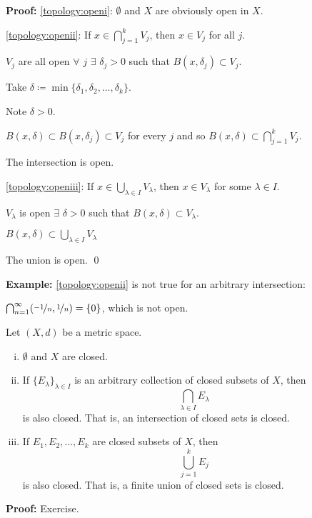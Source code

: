 \documentclass[10pt,aspectratio=149]{beamer}
\begin{document}
\begin{frame}

\textbf{Proof:}
\eqref{topology:openi}:
$\emptyset$ and $X$ are obviously open in $X$.

\pause
\medskip

\eqref{topology:openii}:
If $x \in \bigcap_{j=1}^k V_j$, then $x \in V_j$ for all $j$.

\pause
$V_j$ are all open
\pause
\wthus $\forall$ $j$ $\exists$ $\delta_j > 0$ 
such that $B(x,\delta_j) \subset V_j$.

\pause
Take $\delta \coloneqq \min \{ \delta_1,\delta_2,\ldots,\delta_k \}$.

\pause
Note $\delta > 0$.

\pause
\thus \quad $B(x,\delta) \subset B(x,\delta_j) \subset V_j$ for every $j$ and so
$B(x,\delta) \subset \bigcap_{j=1}^k V_j$.

\pause
\thus \quad The intersection is open.

\pause
\medskip

\eqref{topology:openiii}:
If $x \in \bigcup_{\lambda \in I} V_\lambda$, then $x \in V_\lambda$ for some
$\lambda \in I$.


\pause
$V_\lambda$ is open
\pause
\wthus $\exists$ $\delta > 0$
such that $B(x,\delta) \subset V_\lambda$.

\pause
\thus \quad
$B(x,\delta) \subset \bigcup_{\lambda \in I} V_\lambda$

\pause
\thus \quad The union is open.
\qed

\pause
\medskip

\textbf{Example:}
\eqref{topology:openii} is not true for an arbitrary intersection:

\pause
$\bigcap_{n=1}^\infty (\nicefrac{-1}{n},\nicefrac{1}{n}) = \{ 0 \}$,
which is not open.

\end{frame}

\begin{frame}
\begin{proposition}
Let $(X,d)$ be a metric space.
\begin{enumerate}[(i)]
\item
\pause
\label{topology:closedi} $\emptyset$ and $X$ are closed.
\item
\pause
\label{topology:closedii} If $\{ E_\lambda \}_{\lambda \in I}$ is
an arbitrary collection of closed subsets of $X$, then
\begin{equation*}
\bigcap_{\lambda \in I} E_\lambda
\end{equation*}
is also closed.  That is, an intersection of closed sets is closed.
\item
\pause
\label{topology:closediii} If $E_1, E_2, \ldots, E_k$ are closed
subsets of $X$, then
\begin{equation*}
\bigcup_{j=1}^k E_j
\end{equation*}
is also closed.  That is, a finite union of closed sets is closed.
\end{enumerate}
\end{proposition}

\pause
\textbf{Proof:} Exercise.

\end{frame}
\end{document}
